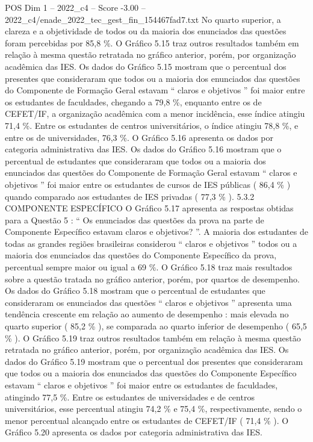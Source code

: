 \begin{textsample}{POS Dim 1 – 2022\_c4 – Score -3.00 – 2022\_c4/enade\_2022\_tec\_gest\_fin\_154467fad7.txt}
No quarto superior, a clareza e a objetividade de todos ou da maioria dos enunciados das questões foram percebidas por 85,8 \%.
O Gráfico 5.15 traz outros resultados também em relação à mesma questão retratada no gráfico anterior, porém, por organização acadêmica das IES.
Os dados do Gráfico 5.15 mostram que o percentual dos presentes que consideraram que todos ou a maioria dos enunciados das questões do Componente de Formação Geral estavam “ claros e objetivos ” foi maior entre os estudantes de faculdades, chegando a 79,8 \%, enquanto entre os de CEFET/IF, a organização acadêmica com a menor incidência, esse índice atingiu 71,4 \%.
Entre os estudantes de centros universitários, o índice atingiu 78,8 \%, e entre os de universidades, 76,3 \%.
O Gráfico 5.16 apresenta os dados por categoria administrativa das IES.
Os dados do Gráfico 5.16 mostram que o percentual de estudantes que consideraram que todos ou a maioria dos enunciados das questões do Componente de Formação Geral estavam “ claros e objetivos ” foi maior entre os estudantes de cursos de IES públicas ( 86,4 \% ) quando comparado aos estudantes de IES privadas ( 77,3 \% ). 5.3.2 COMPONENTE ESPECÍFICO O Gráfico 5.17 apresenta as respostas obtidas para a Questão 5 : “ Os enunciados das questões da prova na parte de Componente Específico estavam claros e objetivos? ”.
A maioria dos estudantes de todas as grandes regiões brasileiras considerou “ claros e objetivos ” todos ou a maioria dos enunciados das questões do Componente Específico da prova, percentual sempre maior ou igual a 69 \%.
O Gráfico 5.18 traz mais resultados sobre a questão tratada no gráfico anterior, porém, por quartos de desempenho.
Os dados do Gráfico 5.18 mostram que o percentual de estudantes que consideraram os enunciados das questões “ claros e objetivos ” apresenta uma tendência crescente em relação ao aumento de desempenho : mais elevada no quarto superior ( 85,2 \% ), se comparada ao quarto inferior de desempenho ( 65,5 \% ).
O Gráfico 5.19 traz outros resultados também em relação à mesma questão retratada no gráfico anterior, porém, por organização acadêmica das IES.
Os dados do Gráfico 5.19 mostram que o percentual dos presentes que consideraram que todos ou a maioria dos enunciados das questões do Componente Específico estavam “ claros e objetivos ” foi maior entre os estudantes de faculdades, atingindo 77,5 \%.
Entre os estudantes de universidades e de centros universitários, esse percentual atingiu 74,2 \% e 75,4 \%, respectivamente, sendo o menor percentual alcançado entre os estudantes de CEFET/IF ( 71,4 \% ).
O Gráfico 5.20 apresenta os dados por categoria administrativa das IES.

\end{textsample}
